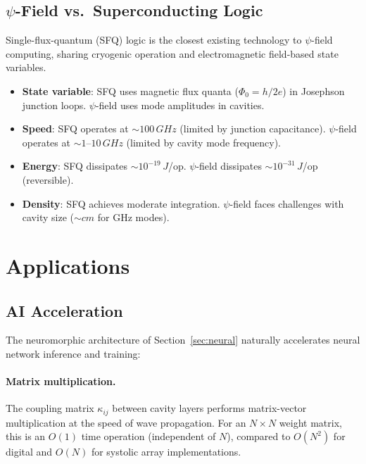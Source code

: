 \documentclass[12pt,a4paper,twoside]{article}
\begin{document}
\subsection{$\psi$-Field vs.\ Superconducting Logic}\label{sec:vs_sfq}

Single-flux-quantum (SFQ) logic is the closest existing technology to $\psi$-field computing, sharing cryogenic operation and electromagnetic field-based state variables.

\begin{itemize}
\item \textbf{State variable}: SFQ uses magnetic flux quanta ($\Phi_0 = h/2e$) in Josephson junction loops. $\psi$-field uses mode amplitudes in cavities.
\item \textbf{Speed}: SFQ operates at $\sim 100\,\si{GHz}$ (limited by junction capacitance). $\psi$-field operates at $\sim 1$--$10\,\si{GHz}$ (limited by cavity mode frequency).
\item \textbf{Energy}: SFQ dissipates $\sim 10^{-19}\,\si{J}$/op. $\psi$-field dissipates $\sim 10^{-31}\,\si{J}$/op (reversible).
\item \textbf{Density}: SFQ achieves moderate integration. $\psi$-field faces challenges with cavity size ($\sim \si{cm}$ for GHz modes).
\end{itemize}

\section{Applications}\label{sec:applications}

\subsection{AI Acceleration}\label{sec:ai}

The neuromorphic architecture of Section~\ref{sec:neural} naturally accelerates neural network inference and training:

\paragraph{Matrix multiplication.} The coupling matrix $\kappa_{ij}$ between cavity layers performs matrix-vector multiplication at the speed of wave propagation. For an $N \times N$ weight matrix, this is an $O(1)$ time operation (independent of $N$), compared to $O(N^2)$ for digital and $O(N)$ for systolic array implementations.
\end{document}
